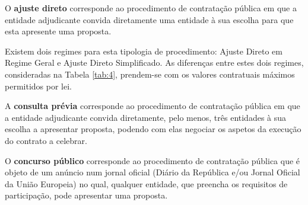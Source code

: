 \begin{my_enumerate}
	
	
	\item O \textbf{ajuste direto} corresponde ao procedimento de contratação pública em que a entidade adjudicante convida diretamente uma entidade à sua escolha para que esta apresente uma proposta\cite{ajustedir}. 
	
	Existem dois regimes para esta tipologia de procedimento: Ajuste Direto em Regime Geral e Ajuste Direto Simplificado. As diferenças entre estes dois regimes, consideradas na Tabela \ref{tab:4}, prendem-se com os valores contratuais máximos permitidos por lei.
	
	
	\item A \textbf{consulta prévia} corresponde ao procedimento de contratação pública em que a entidade adjudicante convida diretamente, pelo menos, três entidades à sua escolha a apresentar proposta, podendo com elas negociar os aspetos da execução do contrato a celebrar\cite{consultaprev}. 
	
	
	
	\item O \textbf{concurso público} corresponde ao procedimento de contratação pública que é objeto de um anúncio num jornal oficial (Diário da República e/ou Jornal Oficial da União Europeia) no qual, qualquer entidade, que preencha os requisitos de participação, pode apresentar uma proposta\cite{concursopub}. 
	

\end{my_enumerate}
